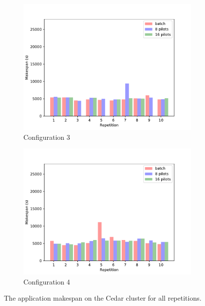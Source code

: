 \begin{figure}
\begin{subfigure}[b]{0.475\textwidth}
		\centering
		\includegraphics[width=\textwidth]{figures/part2-chp2/dedicated_3_cedar}
		\caption[]%
		{{\small Configuration 3}}
		\label{fig:cedar3}
	    \end{subfigure}
	    \quad
	    \begin{subfigure}[b]{0.475\textwidth}
		\centering
		\includegraphics[width=\textwidth]{figures/part2-chp2/dedicated_4_cedar}
		\caption[]%
		{{\small Configuration 4}}
		\label{fig:cedar4}
	    \end{subfigure}
	    \caption{\small The application makespan on the Cedar cluster for all repetitions.}
	    \label{fig:makespanscedar}
	\end{figure}
    
